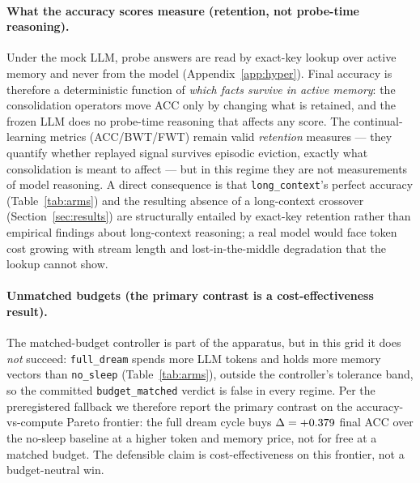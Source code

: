 \paragraph{What the accuracy scores measure (retention, not probe-time reasoning).}
Under the mock LLM, probe answers are read by exact-key lookup over active memory
and never from the model (Appendix~\ref{app:hyper}). Final accuracy is therefore a
deterministic function of \emph{which facts survive in active memory}: the
consolidation operators move ACC only by changing what is retained, and the frozen
LLM does no probe-time reasoning that affects any score. The continual-learning
metrics (ACC/BWT/FWT) remain valid \emph{retention} measures --- they quantify
whether replayed signal survives episodic eviction, exactly what consolidation is
meant to affect --- but in this regime they are not measurements of model
reasoning. A direct consequence is that \texttt{long\_context}'s perfect accuracy
(Table~\ref{tab:arms}) and the resulting absence of a long-context crossover
(Section~\ref{sec:results}) are structurally entailed by exact-key retention rather
than empirical findings about long-context reasoning; a real model would face
token cost growing with stream length and lost-in-the-middle degradation that the
lookup cannot show.

\paragraph{Unmatched budgets (the primary contrast is a cost-effectiveness result).}
The matched-budget controller is part of the apparatus, but in this grid it does
\emph{not} succeed: \texttt{full\_dream} spends more LLM tokens and holds more
memory vectors than \texttt{no\_sleep} (Table~\ref{tab:arms}), outside the
controller's tolerance band, so the committed \texttt{budget\_matched} verdict is
false in every regime. Per the preregistered fallback we therefore report the
primary contrast on the accuracy-vs-compute Pareto frontier: the full dream cycle
buys $\Delta=+0.379$ final ACC over the no-sleep baseline at a higher token
and memory price, not for free at a matched budget. The defensible claim is
cost-effectiveness on this frontier, not a budget-neutral win.


